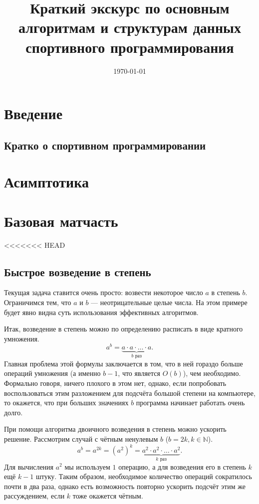 \documentclass[a4paper,8pt]{article}
\begin{document}
\title{Краткий экскурс по основным алгоритмам и структурам данных спортивного программирования}
\date{\today}
\maketitle
\newpage
\tableofcontents
\newpage

\section{Введение}
    \subsection{Кратко о спортивном программировании}
\section{Асимптотика} 
\section{Базовая матчасть}
<<<<<<< HEAD
    \subsection{Быстрое возведение в степень}
        Текущая задача ставится очень просто: возвести некоторое число \(a\) в степень \(b\). Ограничимся тем, что $a$ и $b$ --- неотрицательные целые числа. На этом примере будет явно видна суть использования эффективных алгоритмов.

        Итак, возведение в степень можно по определению расписать в виде кратного умножения.
        \[a^b=\underbrace{a \cdot a \cdot \ldots \cdot a}_\text{\(b\) раз}.\]
        Главная проблема этой формулы заключается в том, что в ней гораздо больше операций умножения (а именно $b - 1$, что является \(O(b)\)), чем необходимо. Формально говоря, ничего плохого в этом нет, однако, если попробовать воспользоваться этим разложением для подсчёта большой степени на компьютере, то окажется, что при больших значениях \(b\) программа начинает работать очень долго.

        При помощи алгоритма двоичного возведения в степень можно ускорить решение. Рассмотрим случай с чётным ненулевым $b$ (\(b = 2k, k \in \mathbb{N}\)).
        \[a^b = a^{2k} = (a^{2})^k = \underbrace{a^2 \cdot a^2 \cdot \ldots \cdot a^2}_\text{\(k\) раз}.\]
        Для вычисления $a^2$ мы используем $1$ операцию, а для возведения его в степень $k$ ещё $k - 1$ штуку. Таким образом, необходимое количество операций сократилось почти в два раза, однако есть возможность повторно ускорить подсчёт этим же рассуждением, если $k$ тоже окажется чётным.
\end{document}
